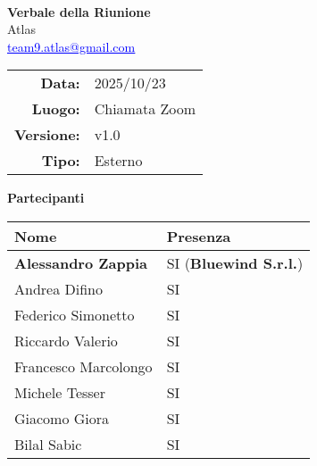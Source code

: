 \documentclass[a4paper,12pt]{article}
\makeatletter
\newcommand{\Gruppo}{Atlas}
\newcommand{\Email}{\href{mailto:team9.atlas@gmail.com}{\textcolor{blue}{\underline{team9.atlas@gmail.com}}}}
\newcommand{\TitoloVerbale}{Verbale della Riunione}
\newcommand{\DataVerbale}{2025/10/23}
\newcommand{\LuogoVerbale}{Chiamata Zoom}
\newcommand{\LogoGruppo}{img/AtlasLogo.png}
\newcommand{\VersioneVerbale}{v1.0} %
\newcommand{\VerbaleEsterno}{Esterno}
\makeatother
\begin{document}
\begin{titlepage}
    \centering

    \vspace*{0cm}
    \\
    [.5cm]
    {\Huge \textbf{\TitoloVerbale}}\\[0.8cm]
    {\LARGE \Gruppo}\\[0.1cm]
    {\Email}\\[1.2cm]

    \begin{tabular}{rl}
        \textbf{Data:} & \DataVerbale \\
        \textbf{Luogo:} & \LuogoVerbale \\
        \textbf{Versione:} & \VersioneVerbale \\
        \textbf{Tipo:} & \VerbaleEsterno \\
    \end{tabular}

    \vspace{1.2cm}

    {\large \textbf{Partecipanti}}\\[0.5cm]
    \begin{tabular}{l|l}
        \textbf{Nome} & \textbf{Presenza} \\
        \hline
        \textbf{Alessandro Zappia} & SI (\textbf{Bluewind S.r.l.})\\
        Andrea Difino & SI \\
        Federico Simonetto & SI \\
        Riccardo Valerio & SI \\
        Francesco Marcolongo & SI \\
        Michele Tesser & SI \\
        Giacomo Giora & SI \\
        Bilal Sabic & SI \\
    \end{tabular}

\end{titlepage}
\end{document}
